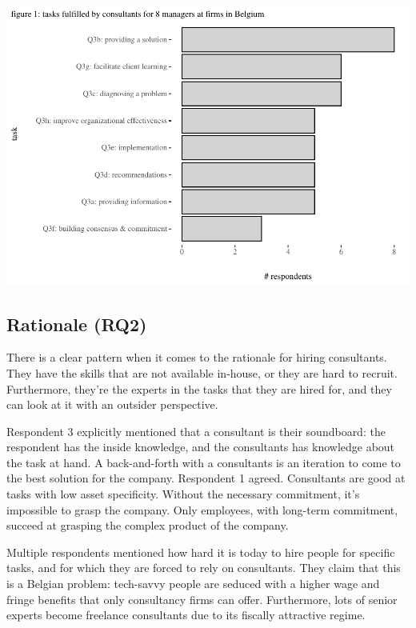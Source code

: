 \documentclass[12pt]{article}
\begin{document}
\(~\)

\includegraphics{2_ams_five_pager_files/figure-latex/unnamed-chunk-2-1.pdf}

\subsection{Rationale (RQ2)}\label{rationale-rq2}

There is a clear pattern when it comes to the rationale for hiring
consultants. They have the skills that are not available in-house, or
they are hard to recruit. Furthermore, they're the experts in the tasks
that they are hired for, and they can look at it with an outsider
perspective.

Respondent 3 explicitly mentioned that a consultant is their soundboard:
the respondent has the inside knowledge, and the consultants has
knowledge about the task at hand. A back-and-forth with a consultants is
an iteration to come to the best solution for the company. Respondent 1
agreed. Consultants are good at tasks with low asset specificity.
Without the necessary commitment, it's impossible to grasp the company.
Only employees, with long-term commitment, succeed at grasping the
complex product of the company.

Multiple respondents mentioned how hard it is today to hire people for
specific tasks, and for which they are forced to rely on consultants.
They claim that this is a Belgian problem: tech-savvy people are seduced
with a higher wage and fringe benefits that only consultancy firms can
offer. Furthermore, lots of senior experts become freelance consultants
due to its fiscally attractive regime.
\end{document}
